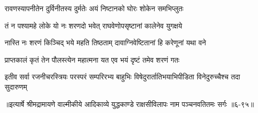 \twolineshloka
{रावणस्यापनीतेन दुर्विनीतस्य दुर्मतेः}
{अयं निष्टानको घोरः शोकेन समभिप्लुतः} %

\twolineshloka
{तं न पश्यामहे लोके यो नः शरणदो भवेत्}
{राघवेणोपसृष्टानां कालेनेव युगक्षये} %

\twolineshloka
{नास्ति नः शरणं किञ्चिद् भये महति तिष्ठताम्}
{दावाग्निवेष्टितानां हि करेणूनां यथा वने} %

\twolineshloka
{प्राप्तकालं कृतं तेन पौलस्त्येन महात्मना}
{यत एव भयं दृष्टं तमेव शरणं गतः} %

\twolineshloka
{इतीव सर्वा रजनीचरस्त्रियः परस्परं सम्परिरभ्य बाहुभिः}
{विषेदुरार्तातिभयाभिपीडिता विनेदुरुच्चैश्च तदा सुदारुणम्} %


॥इत्यार्षे श्रीमद्रामायणे वाल्मीकीये आदिकाव्ये युद्धकाण्डे राक्षसीविलापः नाम पञ्चनवतितमः सर्गः ॥६-९५॥
